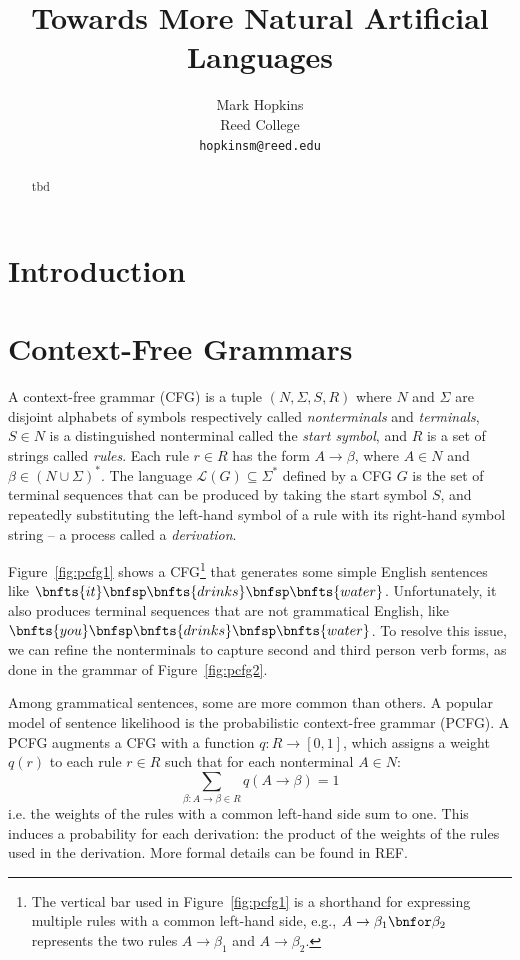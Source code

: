 \documentclass[11pt]{article}
\title{Towards More Natural Artificial Languages}
\author{Mark Hopkins \\
  Reed College \\
  \texttt{hopkinsm@reed.edu} \\}
\renewcommand{\bnfpo}{\rightarrow}
\begin{document}
\maketitle
\begin{abstract}
tbd
\end{abstract}

\section{Introduction}

\section{Context-Free Grammars}

A context-free grammar (CFG) is a tuple $(N,\Sigma,S,R)$ where $N$ and $\Sigma$ are disjoint alphabets of symbols respectively called \emph{nonterminals} and \emph{terminals}, $S \in N$ is a distinguished nonterminal called the \emph{start symbol}, and $R$ is a set of strings called \emph{rules}. Each rule $r \in R$ has the form $A \bnfpo \beta$, where $A \in N$ and $\beta \in (N \cup \Sigma)^*$. The language $\mathcal{L}(G) \subseteq \Sigma^*$ defined by a CFG $G$ is the set of terminal sequences that can be produced by taking the start symbol $S$, and repeatedly substituting the left-hand symbol of a rule with its right-hand symbol string -- a process called a \emph{derivation}.

Figure~\ref{fig:pcfg1} shows a CFG\footnote{The vertical bar used in Figure~\ref{fig:pcfg1} is a shorthand for expressing multiple rules with a common left-hand side, e.g., $A \bnfpo \beta_1 \bnfor \beta_2$ represents the two rules $A \bnfpo \beta_1$ and $A \bnfpo \beta_2$.} that generates some simple English sentences like $\bnfts{it} \bnfsp \bnfts{drinks} \bnfsp \bnfts{water}$. Unfortunately, it also produces terminal sequences that are not grammatical English, like $\bnfts{you} \bnfsp \bnfts{drinks} \bnfsp \bnfts{water}$. To resolve this issue, we can refine the nonterminals to capture second and third person verb forms, as done in the grammar of Figure~\ref{fig:pcfg2}.


Among grammatical sentences, some are more common than others. A popular model of sentence likelihood is the probabilistic context-free grammar (PCFG). A PCFG augments a CFG with a function $q: R \rightarrow [0,1]$, which assigns a weight $q(r)$ to each rule $r \in R$ such that for each nonterminal $A \in N$:
\begin{equation*}
	\sum\limits_{\beta: A \bnfpo \beta \in R} q(A \bnfpo \beta) = 1
\end{equation*}
\noindent i.e. the weights of the rules with a common left-hand side sum to one. This induces a probability for each derivation: the product of the weights of the rules used in the derivation. More formal details can be found in REF. 
\end{document}
